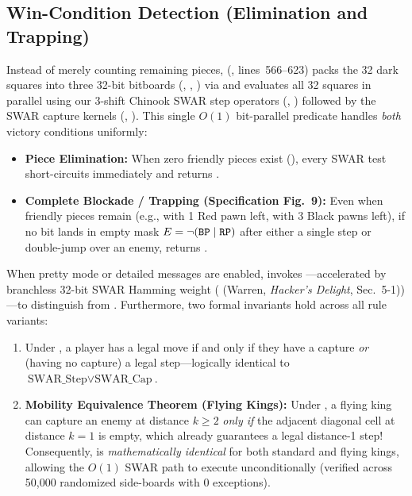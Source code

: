 \subsection{Win-Condition Detection (Elimination and Trapping)}
\label{sec:win_detect}
Instead of merely counting remaining pieces,  (, lines~566--623) packs the 32 dark squares into three 32-bit bitboards (, , ) via  and evaluates all 32 squares in parallel using our 3-shift Chinook SWAR step operators (, ) followed by the SWAR capture kernels (, ). This single $O(1)$ bit-parallel predicate handles \emph{both} victory conditions uniformly:
\begin{itemize}
    \item \textbf{Piece Elimination:} When zero friendly pieces exist (), every SWAR test short-circuits immediately and returns .
    \item \textbf{Complete Blockade / Trapping (Specification Fig.~9):} Even when friendly pieces remain (e.g.,  with 1 Red pawn left,  with 3 Black pawns left), if no bit lands in empty mask $E = \neg(\texttt{BP} \mid \texttt{RP})$ after either a single step or double-jump over an enemy,  returns .
\end{itemize}
When pretty mode or detailed messages are enabled,  invokes ---accelerated by branchless 32-bit SWAR Hamming weight ( (Warren, \emph{Hacker's Delight}, Sec.~5-1))---to distinguish  from . Furthermore, two formal invariants hold across all rule variants:
\begin{enumerate}
    \item Under , a player has a legal move if and only if they have a capture \emph{or} (having no capture) a legal step---logically identical to $\text{SWAR\_Step} \lor \text{SWAR\_Cap}$.
    \item \textbf{Mobility Equivalence Theorem (Flying Kings):} Under , a flying king can capture an enemy at distance $k \ge 2$ \emph{only if} the adjacent diagonal cell at distance $k = 1$ is empty, which already guarantees a legal distance-1 step! Consequently,  is \emph{mathematically identical} for both standard and flying kings, allowing the $O(1)$ SWAR path to execute unconditionally (verified across 50,000 randomized side-boards with 0 exceptions).
\end{enumerate}

